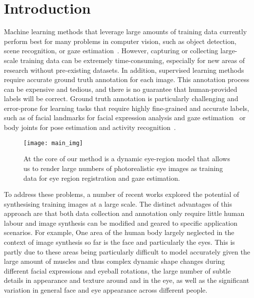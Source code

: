 
\section{Introduction}


Machine learning methods that leverage large amounts of training data currently perform best for many problems in computer vision, such as object detection, scene recognition, or gaze estimation~\cite{zhou2014learning,girshick2014rich,zhang15_cvpr}.
However, capturing or collecting large-scale training data can be extremely time-consuming, especially for new areas of research without pre-existing datasets.
In addition, supervised learning methods require accurate ground truth annotation for each image.
This annotation process can be expensive and tedious, and there is no guarantee that human-provided labels will be correct.
Ground truth annotation is particularly challenging and error-prone for learning tasks that require highly fine-grained and accurate labels, such as of facial landmarks for facial expression analysis and gaze estimation~ or body joints for pose estimation and activity recognition~.

\begin{figure}
    \texttt{[image: main\_img]}
    \caption{At the core of our method is a dynamic eye-region model that allows us to render large numbers of photorealistic eye images as training data for eye region registration and gaze estimation.}
    \label{fig:teaser}
\end{figure}

To address these problems, a number of recent works explored the potential of synthesising training images at a large scale.
The distinct advantages of this approach are that both data collection and annotation only require little human labour and image synthesis can be modified and geared to specific application scenarios.
For example, 
One area of the human body largely neglected in the context of image synthesis so far is the face and particularly the eyes.
This is partly due to these areas being particularly difficult to model accurately given the large amount of muscles and thus complex dynamic shape changes during different facial expressions and eyeball rotations, the large number of subtle details in appearance and texture around and in the eye, as well as the significant variation in general face and eye appearance across different people.

